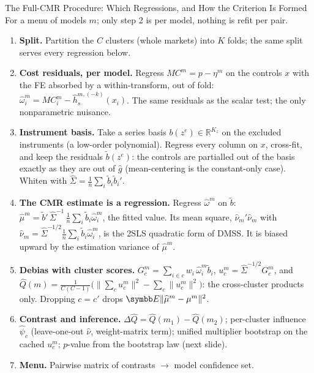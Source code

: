 \documentclass[aspectratio=169,10pt]{beamer}
\begin{document}
\begin{frame}{The Full-CMR Procedure: Which Regressions, and How the Criterion Is Formed}
\footnotesize
For a menu of models $m$; only step 2 is per model, nothing is refit per pair.
\begin{enumerate}
\item \textbf{Split.} Partition the $C$ clusters (whole markets) into $K$ folds; the same split serves every regression below.
\item \textbf{Cost residuals, per model.} Regress $MC^m = p - \eta^m$ on the controls $x$ with the FE absorbed by a within-transform, out of fold: $\widehat{\omega}^m_i = MC^m_i - \widehat{h}_s^{m,(-k)}(x_i)$. The same residuals as the scalar test; the only nonparametric nuisance.
\item \textbf{Instrument basis.} Take a series basis $b(z^e) \in \mathbb{R}^{K_z}$ on the excluded instruments (a low-order polynomial). Regress every column on $x$, cross-fit, and keep the residuals $\tilde{b}(z^e)$: the controls are partialled out of the basis exactly as they are out of $\widehat{g}$ (mean-centering is the constant-only case). Whiten with $\widehat{\Sigma} = \frac{1}{n}\sum_i \tilde{b}_i \tilde{b}_i'$.
\item \textbf{The CMR estimate is a regression.} Regress $\widehat{\omega}^m$ on $\tilde{b}$: $\widehat{\mu}^m = \tilde{b}'\,\widehat{\Sigma}^{-1}\, \frac{1}{n}\sum_i \tilde{b}_i \widehat{\omega}^m_i$, the fitted value. Its mean square, $\widehat{\nu}_m' \widehat{\nu}_m$ with $\widehat{\nu}_m = \widehat{\Sigma}^{-1/2} \frac{1}{n}\sum_i \tilde{b}_i \widehat{\omega}^m_i$, is the 2SLS quadratic form of DMSS. It is biased upward by the estimation variance of $\widehat{\mu}^m$.
\item \textbf{Debias with cluster scores.} $G^m_c = \sum_{i \in c} w_i\, \widehat{\omega}^m_i \tilde{b}_i$, $u^m_c = \widehat{\Sigma}^{-1/2} G^m_c$, and
$\widehat{Q}(m) = \frac{1}{C(C-1)}\big(\|\sum_c u^m_c\|^2 - \sum_c \|u^m_c\|^2\big)$: the cross-cluster products only. Dropping $c = c'$ drops $\E\|\widehat{\mu}^m - \mu^m\|^2$.
\item \textbf{Contrast and inference.} $\Delta\widehat{Q} = \widehat{Q}(m_1) - \widehat{Q}(m_2)$; per-cluster influence $\widehat{\psi}_c$ (leave-one-out $\widehat{\nu}$, weight-matrix term); unified multiplier bootstrap on the cached $u^m_c$; $p$-value from the bootstrap law (next slide).
\item \textbf{Menu.} Pairwise matrix of contrasts $\rightarrow$ model confidence set.
\end{enumerate}
\end{frame}
\end{document}
